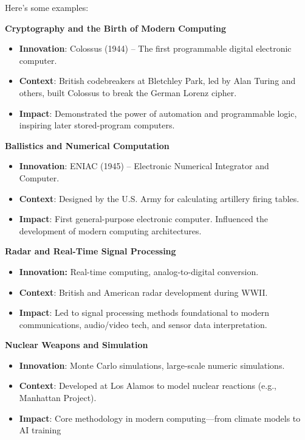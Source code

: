 Here's some examples:

\textbf{Cryptography and the Birth of Modern Computing}
\begin{itemize}
	\item \textbf{Innovation}: Colossus (1944) – The first programmable digital electronic computer.
	\item \textbf{Context}: British codebreakers at Bletchley Park, led by Alan Turing and others, built Colossus to break the German Lorenz cipher.
	\item \textbf{Impact}: Demonstrated the power of automation and programmable logic, inspiring later stored-program computers. \cite{colossus2006}
\end{itemize}

\textbf{Ballistics and Numerical Computation}
\begin{itemize}
	\item \textbf{Innovation}: ENIAC (1945) – Electronic Numerical Integrator and Computer.
	\item \textbf{Context}: Designed by the U.S. Army for calculating artillery firing tables.
	\item \textbf{Impact}: First general-purpose electronic computer. Influenced the development of modern computing architectures. \cite{montecarlo2014}
\end{itemize}

\textbf{Radar and Real-Time Signal Processing}
\begin{itemize}
	\item \textbf{Innovation:} Real-time computing, analog-to-digital conversion.
	\item \textbf{Context}: British and American radar development during WWII.
	\item \textbf{Impact}: Led to signal processing methods foundational to modern communications, audio/video tech, and sensor data interpretation. \cite{Whirlwind1980}
\end{itemize}

\textbf{Nuclear Weapons and Simulation}
\begin{itemize}
	\item \textbf{Innovation}: Monte Carlo simulations, large-scale numeric simulations.
	\item \textbf{Context}: Developed at Los Alamos to model nuclear reactions (e.g., Manhattan Project).
	\item \textbf{Impact}: Core methodology in modern computing—from climate models to AI training \cite{MonteCarloMethod1949}
\end{itemize}

